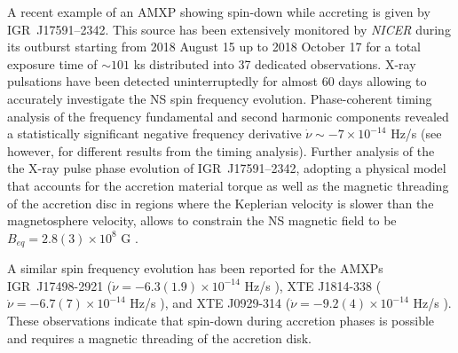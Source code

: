 \documentclass[graybox]{svmult}
\def \nicer{{\em NICER\xspace}}
\begin{document}
A recent example of an AMXP showing spin-down while accreting is given by IGR~J17591--2342. This source has been extensively monitored by \nicer{} during its outburst starting from 2018 August 15 up to 2018 October 17 for a total exposure time of  $\sim101$ ks distributed into 37 dedicated observations. X-ray pulsations have been detected uninterruptedly for almost 60 days allowing to accurately investigate the NS spin frequency evolution. Phase-coherent timing analysis of the frequency fundamental and second harmonic components revealed a statistically significant negative frequency derivative $\dot{\nu}\sim -7\times 10^{-14}$ Hz/s \cite{Sanna2020c} (see however, \cite{Kuiper2020} for different results from the timing analysis). Further analysis of the the X-ray pulse phase evolution of IGR~J17591--2342, adopting a physical model that accounts for the accretion material torque as well as the magnetic threading of the accretion disc in regions where the Keplerian velocity is slower than the magnetosphere velocity, allows to constrain the NS magnetic field to be $B_{eq} = 2.8(3)\times10^8$ G \cite{Sanna2020c}.

A similar spin frequency evolution has been reported for the AMXPs IGR~J17498-2921 ($\dot{\nu}=-6.3(1.9)\times 10^{-14}$ Hz/s \cite{Papitto2011b}), XTE J1814-338 ($\dot{\nu}=-6.7(7)\times 10^{-14}$ Hz/s \cite{Papitto2007}), and XTE J0929-314 ($\dot{\nu}=-9.2(4)\times 10^{-14}$ Hz/s \cite{Galloway2002}). %
These observations indicate that spin-down during accretion phases is possible and requires a magnetic threading of the accretion disk.  
\end{document}
